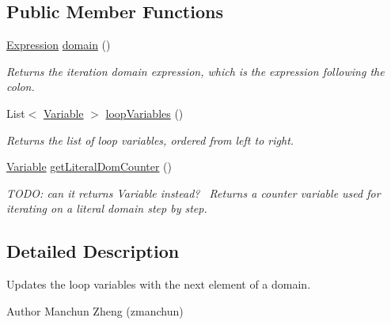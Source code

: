\subsection*{Public Member Functions}
\begin{DoxyCompactItemize}
\item 
\hyperlink{interfaceedu_1_1udel_1_1cis_1_1vsl_1_1civl_1_1model_1_1IF_1_1expression_1_1Expression}{Expression} \hyperlink{interfaceedu_1_1udel_1_1cis_1_1vsl_1_1civl_1_1model_1_1IF_1_1statement_1_1DomainIteratorStatement_a709b14125aa8c8a233cc8487a8e9c294}{domain} ()
\begin{DoxyCompactList}\small\item\em Returns the iteration domain expression, which is the expression following the colon. \end{DoxyCompactList}\item 
List$<$ \hyperlink{interfaceedu_1_1udel_1_1cis_1_1vsl_1_1civl_1_1model_1_1IF_1_1variable_1_1Variable}{Variable} $>$ \hyperlink{interfaceedu_1_1udel_1_1cis_1_1vsl_1_1civl_1_1model_1_1IF_1_1statement_1_1DomainIteratorStatement_a38791f58d77ff3eef2f3c600c157b6da}{loop\+Variables} ()
\begin{DoxyCompactList}\small\item\em Returns the list of loop variables, ordered from left to right. \end{DoxyCompactList}\item 
\hyperlink{interfaceedu_1_1udel_1_1cis_1_1vsl_1_1civl_1_1model_1_1IF_1_1variable_1_1Variable}{Variable} \hyperlink{interfaceedu_1_1udel_1_1cis_1_1vsl_1_1civl_1_1model_1_1IF_1_1statement_1_1DomainIteratorStatement_a5ee1f23fed4a282e272676e227256100}{get\+Literal\+Dom\+Counter} ()
\begin{DoxyCompactList}\small\item\em T\+O\+D\+O\+: can it returns Variable instead?~\newline
 Returns a counter variable used for iterating on a literal domain step by step. \end{DoxyCompactList}\end{DoxyCompactItemize}


\subsection{Detailed Description}
Updates the loop variables with the next element of a domain. 

\begin{DoxyAuthor}{Author}
Manchun Zheng (zmanchun) 
\end{DoxyAuthor}


